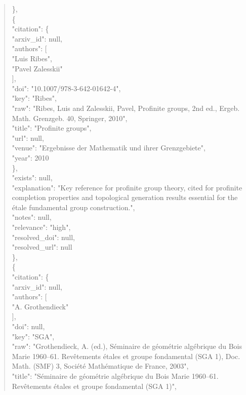 \documentclass[11pt]{article}
\begin{document}
\begin{quote}
    \},\\
    \{\\
      "citation": \{\\
        "arxiv\_id": null,\\
        "authors": [\\
          "Luis Ribes",\\
          "Pavel Zalesskii"\\
        ],\\
        "doi": "10.1007/978-3-642-01642-4",\\
        "key": "Ribes",\\
        "raw": "Ribes, Luis and Zalesskii, Pavel, Profinite groups, 2nd ed., Ergeb. Math. Grenzgeb. 40, Springer, 2010",\\
        "title": "Profinite groups",\\
        "url": null,\\
        "venue": "Ergebnisse der Mathematik und ihrer Grenzgebiete",\\
        "year": 2010\\
      \},\\
      "exists": null,\\
      "explanation": "Key reference for profinite group theory, cited for profinite completion properties and topological generation results essential for the étale fundamental group construction.",\\
      "notes": null,\\
      "relevance": "high",\\
      "resolved\_doi": null,\\
      "resolved\_url": null\\
    \},\\
    \{\\
      "citation": \{\\
        "arxiv\_id": null,\\
        "authors": [\\
          "A. Grothendieck"\\
        ],\\
        "doi": null,\\
        "key": "SGA",\\
        "raw": "Grothendieck, A. (ed.), Séminaire de géométrie algébrique du Bois Marie 1960--61. Revêtements étales et groupe fondamental (SGA 1), Doc. Math. (SMF) 3, Société Mathématique de France, 2003",\\
        "title": "Séminaire de géométrie algébrique du Bois Marie 1960--61. Revêtements étales et groupe fondamental (SGA 1)",\\

\end{quote}
\end{document}

